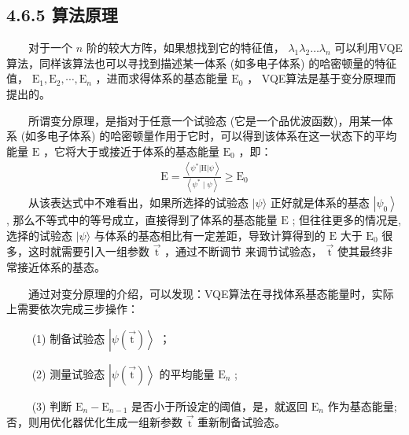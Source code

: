 \documentclass[a4paper,11pt,english]{sphinxmanual}
\begin{document}
\subsection{4.6.5 算法原理}
\label{\detokenize{rst/4.6VQE_u7b97_u6cd5:id5}}
\sphinxAtStartPar
  对于一个  \(n\) 阶的较大方阵，如果想找到它的特征值， \(\lambda_{1} \lambda_{2} \ldots \lambda_{n}\) 可以利用VQE算法，同样该算法也可以寻找到描述某一体系 (如多电子体系) 的哈密顿量的特征值，  \(\mathrm{E}_{1} ,\mathrm{E}_{2}, \cdots ,\mathrm{E}_{n}\) ，进而求得体系的基态能量 \(\mathrm{E}_0\) ， VQE算法是基于变分原理而提出的。

\sphinxAtStartPar
  所谓变分原理，是指对于任意一个试验态 (它是一个品优波函数)，用某一体系 (如多电子体系) 的哈密顿量作用于它时，可以得到该体系在这一状态下的平均能量  \(\mathrm{E}\)  ，它将大于或接近于体系的基态能量  \(\mathrm{E}_{0}\) ，即：
\begin{equation*}
\begin{split}\mathrm{E}=\frac{\left\langle\psi^{*}|\mathrm{H}| \psi\right\rangle}{\left\langle\psi^{*} \mid \psi\right\rangle} \geq \mathrm{E}_{0}\end{split}
\end{equation*}
\sphinxAtStartPar
  从该表达式中不难看出，如果所选择的试验态  \(|\psi\rangle\) 正好就是体系的基态  \(\left|\psi_{0}\right\rangle\) , 那么不等式中的等号成立，直接得到了体系的基态能量 \(\mathrm{E}\) ; 但往往更多的情况是, 选择的试验态  \(|\psi\rangle\) 与体系的基态相比有一定差距，导致计算得到的  \(\mathrm{E}\) 大于  \(\mathrm{E}_0\) 很多，这时就需要引入一组参数  \(\vec{ \mathrm{t}}\) ，通过不断调节 来调节试验态， \(\vec{ \mathrm{t}}\) 使其最终非常接近体系的基态。

\sphinxAtStartPar
  通过对变分原理的介绍，可以发现：VQE算法在寻找体系基态能量时，实际上需要依次完成三步操作：

\sphinxAtStartPar
   (1) 制备试验态  \(\left|\psi\left(\vec{ \mathrm{t}}\right)\right\rangle\) ；

\sphinxAtStartPar
   (2) 测量试验态  \(\left|\psi\left(\vec{ \mathrm{t}}\right)\right\rangle\) 的平均能量 \(\mathrm{E}_n\) ;

\sphinxAtStartPar
   (3) 判断 \(\mathrm{E}_n - \mathrm{E}_{n-1}\) 是否小于所设定的阈值，是，就返回 \(\mathrm{E}_n\) 作为基态能量; 否，则用优化器优化生成一组新参数  \(\vec{ \mathrm{t}}\) 重新制备试验态。

\end{document}
